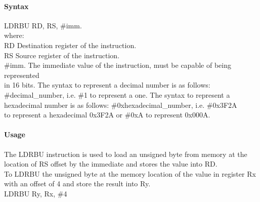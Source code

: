 \documentclass[12pt]{article}
\begin{document}
    \paragraph{Syntax}
    \begin{flushleft}
    LDRBU RD, RS, \#imm.\\
    \vspace{1em}        %
    where:\\
    \vspace{1em}
    RD  \hspace{3.6em} Destination register of the instruction.\\
    \vspace{1em}
    RS  \hspace{3.85em} Source register of the instruction.\\
    \vspace{1em}
    \#imm.  \hspace{1.8em} The immediate value of the instruction, must be capable of being represented\\             \hspace{5.4em} in 16 bits. The syntax to represent a decimal number is as follows:\\
            \hspace{5.4em} \#decimal\_number, i.e. \#1 to represent a one. The syntax to represent a\\
            \hspace{5.4em} hexadecimal number is as follows: \#0xhexadecimal\_number, i.e. \#0x3F2A \\
            \hspace{5.4em} to represent a hexadecimal 0x3F2A or \#0xA to represent 0x000A.\\
    \end{flushleft}
    
    \paragraph{Usage}
    \begin{flushleft}
    The LDRBU instruction is used to load an unsigned byte from memory at the location of RS offset by the immediate and stores the value into RD.\\    
    \vspace{1em}
    To LDRBU the unsigned byte at the memory location of the value in register Rx with an offset of 4 and store the result into Ry.\\
    \vspace{1em}
    LDRBU Ry, Rx, \#4
    \end{flushleft}
    
\end{document}
